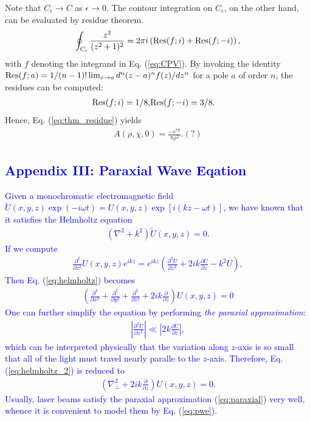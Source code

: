 {\begin{figure}
	\label{fig:contour}
\end{figure}
Note that $C_{\epsilon} \rightarrow C$ as $\epsilon \rightarrow 0$. The contour integration on $C_{\epsilon}$, on the other hand, can be evaluated by residue theorem.
\begin{eqnarray}
\oint_{C_{\epsilon}} \frac{z^2}{(z^2 + 1)^2} = 2\pi i \left( {\rm Res}(f; i) + {\rm Res}(f; -i) \right),
\label{eq:thm_residue}
\end{eqnarray}
with $f$ denoting the integrand in Eq. (\ref{eq:CPV}). By invoking the identity ${\rm Res}(f; a) = 1/(n-1)! \lim_{z \rightarrow a} d^n (z - a)^n f(z) /dz^n$ for a pole $a$ of order $n$, the residues can be computed:
\begin{eqnarray}
	{\rm Res}(f; i) = 1/8, & {\rm Res}(f; -i) = 3/8.
	\nonumber
\end{eqnarray}
Hence, Eq. (\ref{eq:thm_residue}) yields
\begin{eqnarray}
	A(\rho, \chi, 0) = \frac{- e^{i \chi}}{\pi \rho^2}. (?)
\end{eqnarray}
}

\textcolor{blue}{
\section*{Appendix III: Paraxial Wave Eqation}
Given a monochromatic electromagnetic field $\tilde{U}(x, y, z) \exp(-i \omega t) = U(x, y, z)\exp[i (kz - \omega t)]$, we have known that it satisfies the Helmholtz equation
\begin{eqnarray}
	\left(\nabla^2 + k^2\right) \tilde{U}(x, y, z) = 0.
	\label{eq:helmholtz}
\end{eqnarray}
If we compute
\begin{eqnarray}
	\frac{\partial^2}{\partial z^2} U(x, y, z)e^{ikz} = e^{ikz}
		\left( \frac{\partial^2 U}{\partial z^2} + 2ik \frac{\partial U}{\partial z} - k^2 U \right),
	\nonumber
\end{eqnarray}
Then Eq. (\ref{eq:helmholtz}) becomes
\begin{eqnarray}
	\left(\frac{\partial^2}{\partial x^2} + \frac{\partial^2}{\partial y^2} + \frac{\partial^2}{\partial z^2} + 2ik \frac{\partial}{\partial z} \right) U(x, y, z) = 0
	\label{eq:helmholtz_2}
\end{eqnarray}
One can further simplify the equation by performing {\em the paraxial approximation}:
\begin{eqnarray}
	\left| \frac{\partial^2 U}{\partial z^2} \right| \ll \left| 2k \frac{\partial U}{\partial z} \right|,
	\label{eq:paraxial}
\end{eqnarray}
which can be interpreted physically that the variation along $z$-axis is so small that all of the light must travel nearly paralle to the $z$-axis. Therefore, Eq. (\ref{eq:helmholtz_2}) is reduced to
\begin{eqnarray}
	\left(\nabla_{\perp}^2 + 2ik \frac{\partial}{\partial z} \right) U(x, y, z) = 0.
	\label{eq:pwe}
\end{eqnarray}
Usually, laser beams satisfy the paraxial approximation (\ref{eq:paraxial}) very well, whence it is convenient to model them by Eq. (\ref{eq:pwe}).
}
